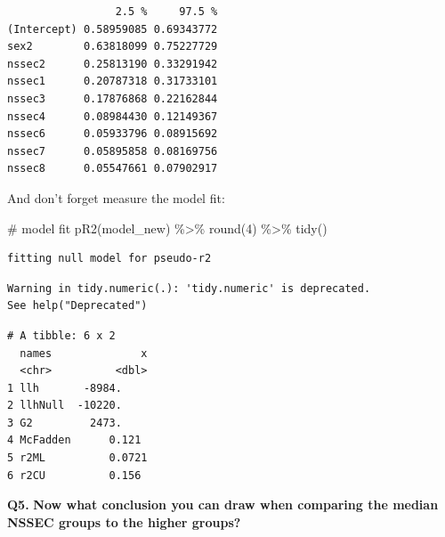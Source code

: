 \documentclass[
  letterpaper,
  DIV=11,
  numbers=noendperiod]{scrreprt}
\newenvironment{Shaded}{\begin{snugshade}}{\end{snugshade}}
\newcommand{\CommentTok}[1]{\textcolor[rgb]{0.37,0.37,0.37}{#1}}
\newcommand{\DecValTok}[1]{\textcolor[rgb]{0.68,0.00,0.00}{#1}}
\newcommand{\FunctionTok}[1]{\textcolor[rgb]{0.28,0.35,0.67}{#1}}
\newcommand{\NormalTok}[1]{\textcolor[rgb]{0.00,0.23,0.31}{#1}}
\newcommand{\SpecialCharTok}[1]{\textcolor[rgb]{0.37,0.37,0.37}{#1}}
\begin{document}
\begin{verbatim}
                 2.5 %     97.5 %
(Intercept) 0.58959085 0.69343772
sex2        0.63818099 0.75227729
nssec2      0.25813190 0.33291942
nssec1      0.20787318 0.31733101
nssec3      0.17876868 0.22162844
nssec4      0.08984430 0.12149367
nssec6      0.05933796 0.08915692
nssec7      0.05895858 0.08169756
nssec8      0.05547661 0.07902917
\end{verbatim}

And don't forget measure the model fit:

\begin{Shaded}
\begin{Highlighting}[]
\CommentTok{\# model fit}
\FunctionTok{pR2}\NormalTok{(model\_new) }\SpecialCharTok{\%\textgreater{}\%} \FunctionTok{round}\NormalTok{(}\DecValTok{4}\NormalTok{) }\SpecialCharTok{\%\textgreater{}\%} \FunctionTok{tidy}\NormalTok{()}
\end{Highlighting}
\end{Shaded}

\begin{verbatim}
fitting null model for pseudo-r2
\end{verbatim}

\begin{verbatim}
Warning in tidy.numeric(.): 'tidy.numeric' is deprecated.
See help("Deprecated")
\end{verbatim}

\begin{verbatim}
# A tibble: 6 x 2
  names              x
  <chr>          <dbl>
1 llh       -8984.    
2 llhNull  -10220.    
3 G2         2473.    
4 McFadden      0.121 
5 r2ML          0.0721
6 r2CU          0.156 
\end{verbatim}

\textbf{Q5.} \textbf{Now what conclusion you can draw when comparing the
median NSSEC groups to the higher groups?}
\end{document}
